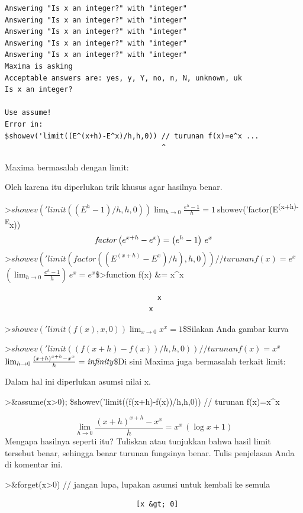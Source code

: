 \documentclass[
]{book}
\begin{document}
\begin{verbatim}
Answering "Is x an integer?" with "integer"
Answering "Is x an integer?" with "integer"
Answering "Is x an integer?" with "integer"
Answering "Is x an integer?" with "integer"
Answering "Is x an integer?" with "integer"
Maxima is asking
Acceptable answers are: yes, y, Y, no, n, N, unknown, uk
Is x an integer?

Use assume!
Error in:
$showev('limit((E^(x+h)-E^x)/h,h,0)) // turunan f(x)=e^x ...
                                     ^
\end{verbatim}

Maxima bermasalah dengan limit:

Oleh karena itu diperlukan trik khusus agar hasilnya benar.

\textgreater{}\(showev('limit((E^h-1)/h,h,0))\)\(\lim_{h\rightarrow 0}{\frac{e^{h}-1}{h}}=1\)\(\>\)showev('factor(E\textsuperscript{(x+h)-E}x)) \[{\it factor}\left(e^{x+h}-e^{x}\right)=\left(e^{h}-1\right)\,e^{x}\]\textgreater{}\(showev('limit(factor((E^(x+h)-E^x)/h),h,0)) // turunan f(x)=e^x\)\(\left(\lim_{h\rightarrow 0}{\frac{e^{h}-1}{h}}\right)\,e^{x}=e^{x}\)\$\textgreater function f(x) \&= x\^{}x

\begin{verbatim}
                                    x
                                  x
\end{verbatim}

\textgreater{}\(showev('limit(f(x),x,0))\)\(\lim_{x\rightarrow 0}{x^{x}}=1\)\$Silakan Anda gambar kurva

\textgreater{}\(showev('limit((f(x+h)-f(x))/h,h,0)) // turunan f(x)=x^x\)\(\lim_{h\rightarrow 0}{\frac{\left(x+h\right)^{x+h}-x^{x}}{h}}={\it infinity}\)\$Di sini Maxima juga bermasalah terkait limit:

Dalam hal ini diperlukan asumsi nilai x.

\textgreater\&assume(x\textgreater0); \$showev('limit((f(x+h)-f(x))/h,h,0)) // turunan f(x)=x\^{}x

\[\lim_{h\rightarrow 0}{\frac{\left(x+h\right)^{x+h}-x^{x}}{h}}=x^{x}\,\left(\log x+1\right)\]Mengapa hasilnya seperti itu? Tuliskan atau tunjukkan bahwa hasil limit tersebut benar, sehingga benar turunan fungsinya benar. Tulis penjelasan Anda di komentar ini.

\textgreater\&forget(x\textgreater0) // jangan lupa, lupakan asumsi untuk kembali ke semula

\begin{verbatim}
                               [x &gt; 0]
\end{verbatim}
\end{document}
